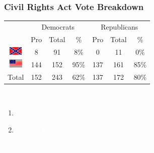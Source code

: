 \documentclass[slides]{beamer}\usepackage[]{graphicx}\usepackage[]{color}
\newcommand{\blue}[1]{\textcolor{blue2}{#1}}
\begin{document}
\begin{frame}
\frametitle{Civil Rights Act Vote Breakdown}

\begin{center}
	\begin{tabular}{c|ccc|ccc}
     & \multicolumn{3}{c|}{Democrats}  & \multicolumn{3}{c}{Republicans} \\ 
     & Pro & Total & \% & Pro & Total & \% \\ 
     \hline
     \includegraphics[height=0.4cm]{conf} & 8 & 91 & \blue{8\%} & 0 & 11 & 0\% \\ 
	 \includegraphics[height=0.4cm]{union} & 144 & 152 & \blue{95\%} & 137 & 161 & 85\% \\ 
    \hline
     Total & 152 & 243 & 62\% & 137 & 172 & \blue{80\%} \\ 
  \end{tabular}
\end{center}

\textcolor{white}{We observe that} 
\begin{enumerate}
\item[] \textcolor{white}{91/(91 + 152) = 37\% of Democrats}
\item[] \textcolor{white}{11/(11+161) = 6\% of Republicans}
\end{enumerate}
\textcolor{white}{were from former confederate states.}

\end{frame}
\end{document}

